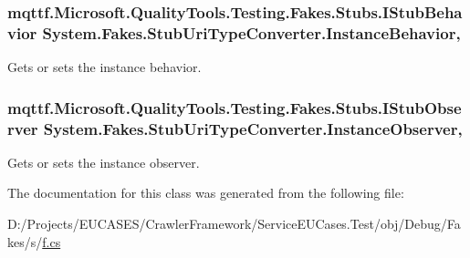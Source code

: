 \hypertarget{class_system_1_1_fakes_1_1_stub_uri_type_converter_a9c8bbd0a939ab70c798c225a958c80c4}{
\subsubsection[{Instance\-Behavior}]{\setlength{\rightskip}{0pt plus 5cm}mqttf.\-Microsoft.\-Quality\-Tools.\-Testing.\-Fakes.\-Stubs.\-I\-Stub\-Behavior System.\-Fakes.\-Stub\-Uri\-Type\-Converter.\-Instance\-Behavior\hspace{0.3cm}{\ttfamily [get]}, {\ttfamily [set]}}}\label{class_system_1_1_fakes_1_1_stub_uri_type_converter_a9c8bbd0a939ab70c798c225a958c80c4}


Gets or sets the instance behavior.

\hypertarget{class_system_1_1_fakes_1_1_stub_uri_type_converter_a138c6fc5d99a2a9e39991f44e6e76f92}{
\subsubsection[{Instance\-Observer}]{\setlength{\rightskip}{0pt plus 5cm}mqttf.\-Microsoft.\-Quality\-Tools.\-Testing.\-Fakes.\-Stubs.\-I\-Stub\-Observer System.\-Fakes.\-Stub\-Uri\-Type\-Converter.\-Instance\-Observer\hspace{0.3cm}{\ttfamily [get]}, {\ttfamily [set]}}}\label{class_system_1_1_fakes_1_1_stub_uri_type_converter_a138c6fc5d99a2a9e39991f44e6e76f92}


Gets or sets the instance observer.



The documentation for this class was generated from the following file\-:\begin{DoxyCompactItemize}
\item 
D\-:/\-Projects/\-E\-U\-C\-A\-S\-E\-S/\-Crawler\-Framework/\-Service\-E\-U\-Cases.\-Test/obj/\-Debug/\-Fakes/s/\hyperlink{s_2f_8cs}{f.\-cs}\end{DoxyCompactItemize}
